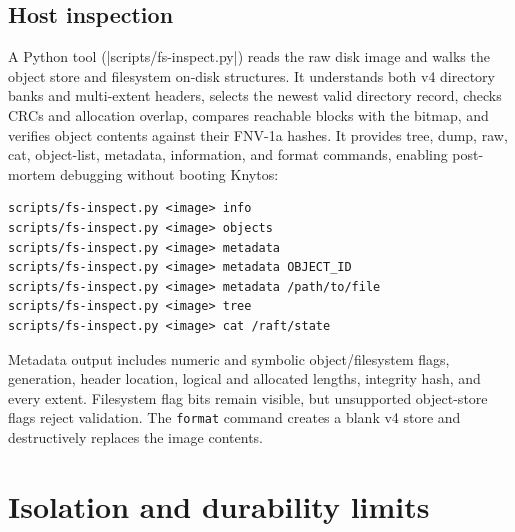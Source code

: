 \subsection{Host inspection}

A Python tool (\repofile|scripts/fs-inspect.py|) reads the raw disk image and
walks the object store and filesystem on-disk structures. It understands both
v4 directory banks and multi-extent headers, selects the newest valid directory
record, checks CRCs and allocation overlap, compares reachable blocks with the
bitmap, and verifies object contents against their FNV-1a hashes. It provides
tree, dump, raw, cat, object-list, metadata, information, and format commands,
enabling post-mortem debugging without booting Knytos:

\begin{verbatim}
scripts/fs-inspect.py <image> info
scripts/fs-inspect.py <image> objects
scripts/fs-inspect.py <image> metadata
scripts/fs-inspect.py <image> metadata OBJECT_ID
scripts/fs-inspect.py <image> metadata /path/to/file
scripts/fs-inspect.py <image> tree
scripts/fs-inspect.py <image> cat /raft/state
\end{verbatim}

Metadata output includes numeric and symbolic object/filesystem flags,
generation, header location, logical and allocated lengths, integrity hash, and
every extent. Filesystem flag bits remain visible, but unsupported object-store flags reject validation. The \texttt{format} command
creates a blank v4 store and destructively replaces the image contents.

\section{Isolation and durability limits}

